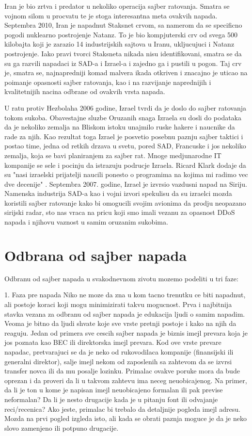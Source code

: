\documentclass[a4paper]{article}
\begin{document}
{Iran je bio  zrtva i predator u nekoliko operacija sajber ratovanja. Smatra se vojnom silom u procvatu te je stoga interesantna meta ovakvih napada.
Septembra 2010, Iran je napadnut Staksnet crvom, sa namerom da se specificno pogodi nuklearno postrojenje Natanz. To je bio kompjuterski crv od svega 500 kilobajta koji je zarazio 14 industrijskih sajtova u Iranu, ukljucujuci i Natanz postrojenje. Iako pravi tvorci Staksneta nikada nisu identifikovani, smatra se da su ga razvili napadaci iz SAD-a i Izrael-a i zajedno ga i pustili u pogon. Taj crv je, smatra se, najnapredniji komad malvera ikada otkriven i znacajno je uticao na poimanje opasnosti sajber ratovanja, kao i na razvijanje naprednijih i kvalitetnijih nacina odbrane od ovakvih vrsta napada.

U ratu protiv Hezbolaha 2006 godine, Izrael tvrdi da je doslo do sajber ratovanja tokom sukoba. Obavestajne sluzbe Oruzanih snaga Izraela su dosli do podataka da je nekoliko zemalja na Bliskom istoku unajmilo ruske hakere i naucnike da rade za njih. Kao rezultat toga Izrael je posvetio posebnu paznju sajber taktici i postao time, jedna od retkih drzava u svetu, pored SAD, Francuske i jos nekoliko zemalja, koja se bavi planiranjem za sajber rat. Mnoge medjunarodne IT kompanije se sele i pocinju da istrazuju podrucje Izraela. Ricard Klark dodaje da su "nasi izraelski prijatelji naucili ponesto o programima na kojima mi radimo vec dve decenije" . 
Septembra 2007. godine, Izrael je izvrsio vazdusni napad na Siriju. Namenska industrija SAD-a kao i vojni izvori spekulisu da su izraelci mozda koristili sajber ratovanje kako bi omogucili svojim avionima da prodju neopazano sirijski radar, sto nas vraca na pricu koji smo imali vezanu za opasnost DDoS napada i njihovu vaznost u samim oruzanim sukobima.

\section{Odbrana od sajber napada}

Odbranu od sajber napada u svakodnevnom zivotu mozemo podeliti u tri faze:

1. Faza pre napada
Niko ne moze da zna u kom tacno trenutku ce biti napadnut, ali postoje koraci koji mogu minimizirati takvu mogucnost. Prva i najbitnija stavka vezana za odbranu od sajber napada je edukacija ljudi o samim napadim. Veoma je bitno da ljudi shvate koje sve vrste pretnji postoje i kako na njih da reaguju.
Jedan od primera sve cescih sajber napada je biznis imejl prevara koja je jos poznata kao BEC ili direktorska imejl prevara. Kod ove vrste prevare napadac, pretvarajuci se da je neko od rukovodilaca kompanije (finansijski ili generalni direktor), salje imejl nekom od zaposlenih sa zahtevom da se izvrsi transfer novca ili da mu posalje lozinku. Primalac ovakve poruke mora da bude oprezan i da proveri da li u takvom zahtevu ima neceg neuobicajenog. Na primer, da li je ton u kome je napisan imejl neuobicajeno formalan ili pak previse neformalan? Da li je nesto drugacije kada je u pitanju font ili odvajanje reci/recenica? Ako jeste, primalac bi trebalo da detaljnije pogleda imejl adresu. Mozda na prvi pogled izgleda isto, ali kada se obrati paznja moguce je da je neko slovo zamenjeno ili potpuno drugacije.

}
\end{document}
